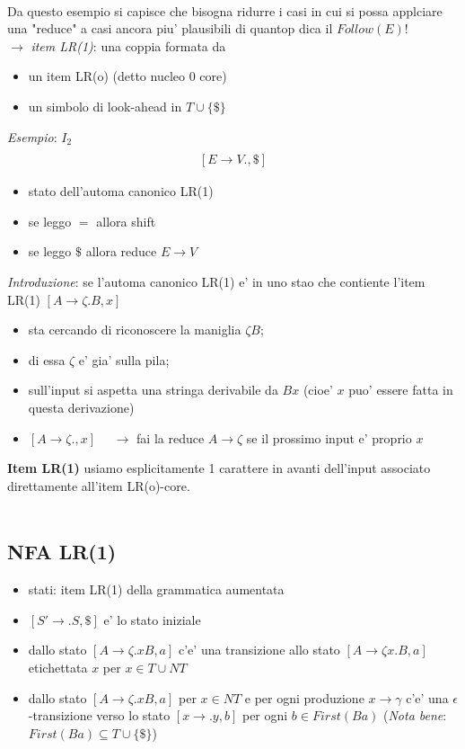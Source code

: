 \documentclass[a4paper,12pt]{article}
\begin{document}
{\vspace{1em} \\
Da questo esempio si capisce che bisogna ridurre i casi in cui si possa applciare una "reduce" a casi ancora piu' plausibili di quantop dica il $Follow(E)$! \\
$\to$ \textit{item LR(1)}: una coppia formata da 
\begin{itemize}
  \item un item LR(o) (detto nucleo 0 core)
  \item un simbolo di look-ahead in $T \cup \{\mathdollar\}$
\end{itemize}
\textit{Esempio}: $I_2$
\begin{align*}
  [S \to V. = E, \mathdollar] \\
  [E \to V., \mathdollar]
\end{align*}
\begin{itemize}
  \item stato dell'automa canonico LR(1)
  \item se leggo $=$ allora shift
  \item se leggo $\mathdollar$ allora reduce $E \to V$
\end{itemize}
\vspace{1em} 
\textit{Introduzione}: se l'automa canonico LR(1) e' in uno stao che contiente l'item LR(1) $[A \to \zeta . B , x]$
\begin{itemize}
  \item sta cercando di riconoscere la maniglia $\zeta B$;
  \item di essa $\zeta$ e' gia' sulla pila;
  \item sull'input si aspetta una stringa derivabile da $Bx$ (cioe' $x$ puo' essere fatta in questa derivazione)
  \item $[A \to \zeta. , x] \quad $ $\to$ fai la reduce $A \to \zeta$ se il prossimo input e' proprio $x$ 
\end{itemize}
\textbf{Item LR(1)} usiamo esplicitamente 1 carattere in avanti dell'input associato direttamente all'item LR(o)-core. \\
\vspace{1em} \\
\subsection{NFA LR(1)}
\begin{itemize}
  \item stati: item LR(1) della grammatica aumentata 
  \item $[S' \to .S, \mathdollar]$ e' lo stato iniziale
  \item dallo stato $[A \to \zeta . xB, a]$ c'e' una transizione allo stato $[A \to \zeta x . B, a]$ etichettata $x$ per $x \in T \cup NT$
  \item dallo stato $[A \to \zeta . xB, a]$ per $x \in NT$ e per ogni produzione $x \to \gamma$ c'e' una $\epsilon$-transizione verso lo stato $[x \to .y, b]$ per ogni $b \in First(Ba)$ (\textit{Nota bene}: $First(Ba) \subseteq T \cup \{\mathdollar\}$)
\end{itemize}
\vspace{1em}
}
\end{document}
